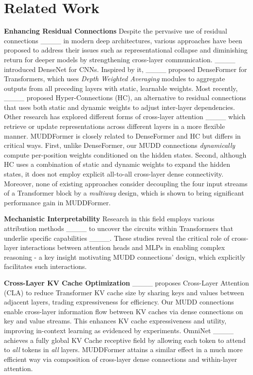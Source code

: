 \section{Related Work}
\label{related_work}
\textbf{Enhancing Residual Connections}
Despite the pervasive use of residual connections ____ in modern deep architectures, various approaches have been proposed to address their issues such as representational collapse and diminishing return for deeper models by strengthening cross-layer communication.
____ introduced DenseNet for CNNs.
Inspired by it, ____ proposed DenseFormer for Transformers, which uses \emph{Depth Weighted Averaging} modules to aggregate outputs from all preceding layers with static, learnable weights. 
Most recently, ____ proposed Hyper-Connections (HC), an alternative to residual connections that uses both static and dynamic weights to adjust inter-layer dependencies.
Other research has explored different forms of cross-layer attention ____
which retrieve or update representations across different layers in a more flexible manner.
MUDDFormer is closely related to DenseFormer and HC but differs in critical ways. 
First, unlike DenseFormer, our MUDD connections \emph{dynamically} compute per-position weights conditioned on the hidden states. 
Second, although HC uses a combination of static and dynamic weights to expand the hidden states, it does not employ explicit all-to-all cross-layer dense connectivity. 
Moreover, none of existing approaches consider decoupling the four input streams of a Transformer block by a \emph{multiway} design, which is shown to bring significant performance gain in MUDDFormer. 

\textbf{Mechanistic Interpretability}
Research in this field employs various attribution methods ____ to uncover the circuits within Transformers that underlie specific capabilities ____. 
These studies reveal the critical role of cross-layer interactions between attention heads and MLPs in enabling complex reasoning - a key insight motivating MUDD connections' design, which explicitly facilitates such interactions.

\textbf{Cross-Layer KV Cache Optimization} 
____ proposes Cross-Layer Attention (CLA) to reduce Transformer KV cache size by sharing keys and values between adjacent layers, trading expressiveness for efficiency. 
Our MUDD connections enable cross-layer information flow between KV caches via dense connections on key and value streams.
This enhances KV cache expressiveness and utility, improving in-context learning as evidenced by experiments.
OmniNet ____ achieves a fully global KV Cache receptive field by allowing each token to attend to \emph{all} tokens in \emph{all} layers.
MUDDFormer attains a similar effect in a much more efficient way via composition of cross-layer dense connections and within-layer attention.

